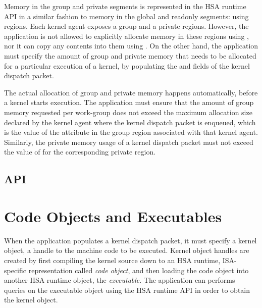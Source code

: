 \documentclass[final,oneside]{book}
\begin{document}
Memory in the group and private segments is represented in the HSA runtime API
in a similar fashion to memory in the global and readonly segments: using
regions. Each kernel agent exposes a group and a private regions. However, the
application is not allowed to explicitly allocate memory in these regions using
, nor it can copy any contents into them using
. On the other hand, the application must specify the
amount of group and private memory that needs to be allocated for a particular
execution of a kernel, by populating the
 and
 fields of the kernel
dispatch packet.

The actual allocation of group and private memory happens automatically, before
a kernel starts execution. The application must ensure that the amount of group
memory requested per work-group does not exceed the maximum allocation size
declared by the kernel agent where the kernel dispatch packet is enqueued, which
is the value of the  attribute in the
group region associated with that kernel agent. Similarly, the private memory
usage of a kernel dispatch packet must not exceed the value of
 for the corresponding private region.

\subsection{API}



\section{Code Objects and Executables}\label{sec:codeobjects}

When the application populates a kernel dispatch packet, it must specify a
kernel object, a handle to the machine code to be executed. Kernel object
handles are created by first compiling the kernel source down to an HSA runtime,
ISA-specific representation called \textit{code object}, and then loading the
code object into another HSA runtime object, the \textit{executable}. The
application can performs queries on the executable object using the HSA runtime
API in order to obtain the kernel object.
\end{document}
